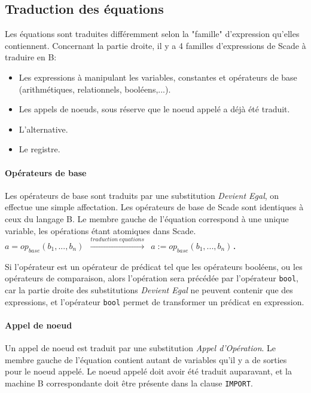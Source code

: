 \subsection{Traduction des équations}

Les équations sont traduites différemment selon la "famille" d'expression qu'elles
contiennent.  
Concernant la partie droite, il y a 4 familles d'expressions de Scade à traduire en B:
\begin{itemize}
\item Les expressions à manipulant les variables, constantes et opérateurs de
  base (arithmétiques, relationnels, booléens,...).
\item Les appels de noeuds, sous réserve que le noeud appelé a déjà été
  traduit. 
\item L'alternative.
\item Le registre.
\end{itemize}

\paragraph{Opérateurs de base}
Les opérateurs de base sont traduits par une substitution \emph{Devient Egal}, on
effectue une simple affectation. Les opérateurs de base de Scade sont identiques
à ceux du langage B. Le membre gauche de l'équation correspond à une unique
variable, les opérations étant atomiques dans Scade. \\

\texttt{$a = op_{base}(b_1,...,b_n)$ $\xrightarrow{traduction ~
equations}$ $a:=op_{base}(b_1,...,b_n)$. }

Si l'opérateur est un opérateur de prédicat tel que les opérateurs booléens, ou
les opérateurs de comparaison, alors l'opération sera précédée par
l'opérateur \texttt{bool}, car la partie droite des substitutions \emph{Devient
Egal} ne peuvent contenir que des expressions, et l'opérateur \texttt{bool}
permet de transformer un prédicat en expression.


\paragraph{Appel de noeud}
Un appel de noeud est traduit par une substitution \emph{Appel d'Opération}. Le
membre gauche de l'équation contient autant de variables qu'il y a de sorties
pour le noeud appelé. Le noeud appelé doit avoir été traduit auparavant, et la
machine B correspondante doit être présente dans la clause \texttt{IMPORT}.\\

